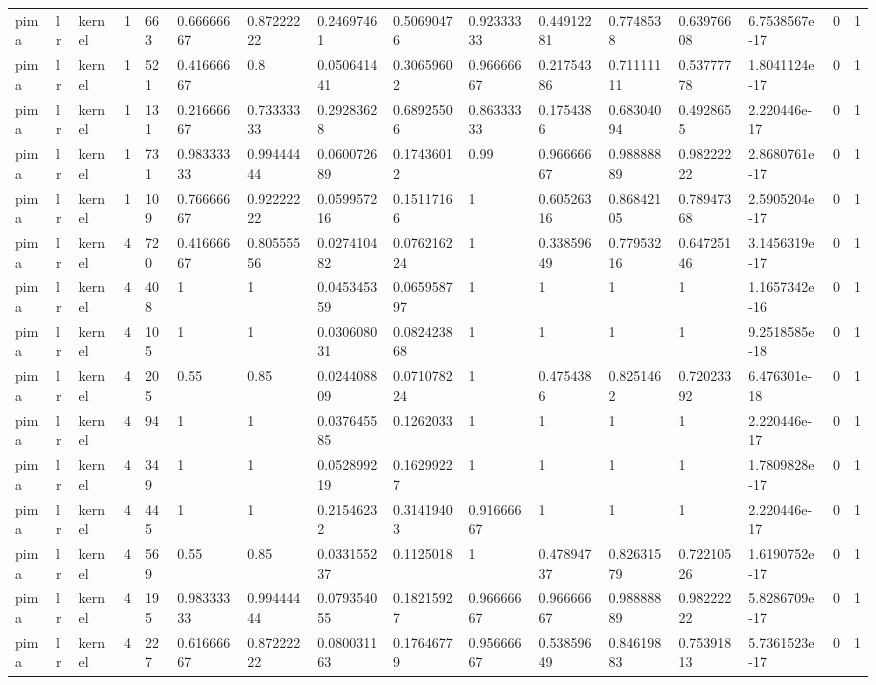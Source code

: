 \begin{tabular}{llllllllllllllll}
pima & lr & kernel & 1 & 663 & 0.66666667 & 0.87222222 & 0.24697461 & 0.50690476 & 0.92333333 & 0.44912281 & 0.7748538 & 0.63976608 & 6.7538567e-17 & 0 & 1 \\
pima & lr & kernel & 1 & 521 & 0.41666667 & 0.8 & 0.050641441 & 0.30659602 & 0.96666667 & 0.21754386 & 0.71111111 & 0.53777778 & 1.8041124e-17 & 0 & 1 \\
pima & lr & kernel & 1 & 131 & 0.21666667 & 0.73333333 & 0.29283628 & 0.68925506 & 0.86333333 & 0.1754386 & 0.68304094 & 0.4928655 & 2.220446e-17 & 0 & 1 \\
pima & lr & kernel & 1 & 731 & 0.98333333 & 0.99444444 & 0.060072689 & 0.17436012 & 0.99 & 0.96666667 & 0.98888889 & 0.98222222 & 2.8680761e-17 & 0 & 1 \\
pima & lr & kernel & 1 & 109 & 0.76666667 & 0.92222222 & 0.059957216 & 0.15117166 & 1 & 0.60526316 & 0.86842105 & 0.78947368 & 2.5905204e-17 & 0 & 1 \\
pima & lr & kernel & 4 & 720 & 0.41666667 & 0.80555556 & 0.027410482 & 0.076216224 & 1 & 0.33859649 & 0.77953216 & 0.64725146 & 3.1456319e-17 & 0 & 1 \\
pima & lr & kernel & 4 & 408 & 1 & 1 & 0.045345359 & 0.065958797 & 1 & 1 & 1 & 1 & 1.1657342e-16 & 0 & 1 \\
pima & lr & kernel & 4 & 105 & 1 & 1 & 0.030608031 & 0.082423868 & 1 & 1 & 1 & 1 & 9.2518585e-18 & 0 & 1 \\
pima & lr & kernel & 4 & 205 & 0.55 & 0.85 & 0.024408809 & 0.071078224 & 1 & 0.4754386 & 0.8251462 & 0.72023392 & 6.476301e-18 & 0 & 1 \\
pima & lr & kernel & 4 & 94 & 1 & 1 & 0.037645585 & 0.1262033 & 1 & 1 & 1 & 1 & 2.220446e-17 & 0 & 1 \\
pima & lr & kernel & 4 & 349 & 1 & 1 & 0.052899219 & 0.16299227 & 1 & 1 & 1 & 1 & 1.7809828e-17 & 0 & 1 \\
pima & lr & kernel & 4 & 445 & 1 & 1 & 0.21546232 & 0.31419403 & 0.91666667 & 1 & 1 & 1 & 2.220446e-17 & 0 & 1 \\
pima & lr & kernel & 4 & 569 & 0.55 & 0.85 & 0.033155237 & 0.1125018 & 1 & 0.47894737 & 0.82631579 & 0.72210526 & 1.6190752e-17 & 0 & 1 \\
pima & lr & kernel & 4 & 195 & 0.98333333 & 0.99444444 & 0.079354055 & 0.18215927 & 0.96666667 & 0.96666667 & 0.98888889 & 0.98222222 & 5.8286709e-17 & 0 & 1 \\
pima & lr & kernel & 4 & 227 & 0.61666667 & 0.87222222 & 0.080031163 & 0.17646779 & 0.95666667 & 0.53859649 & 0.84619883 & 0.75391813 & 5.7361523e-17 & 0 & 1 \\

\end{tabular}
